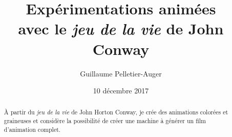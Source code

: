\documentclass[12pt]{article}
\author{Guillaume Pelletier-Auger}
\title{Expérimentations animées\protect\\avec le \textit{jeu de la vie} de John Conway}
\date{10 décembre 2017}
\begin{document}
\maketitle

\begin{abstract}
    À partir du \textit{jeu de la vie} de John Horton Conway, je crée des animations colorées et graineuses et considère la possibilité de créer une machine à générer un film d'animation complet.
\end{abstract}


\end{document}
